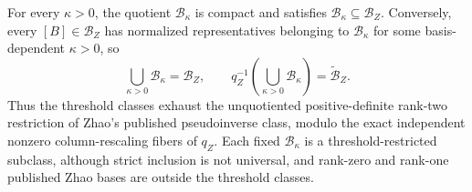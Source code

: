 For every \(\kappa>0\), the quotient \(\mathcal B_\kappa\) is compact and satisfies \(\mathcal B_\kappa\subseteq\mathcal B_Z\).  Conversely, every \([B]\in\mathcal B_Z\) has normalized representatives belonging to \(\mathcal B_\kappa\) for some basis-dependent \(\kappa>0\), so
\[
\bigcup_{\kappa>0}\mathcal B_\kappa=\mathcal B_Z,
\qquad
q_Z^{-1}\!\left(\bigcup_{\kappa>0}\mathcal B_\kappa\right)=\widetilde{\mathcal B}_Z.
\]
Thus the threshold classes exhaust the unquotiented positive-definite rank-two restriction of Zhao's published pseudoinverse class, modulo the exact independent nonzero column-rescaling fibers of \(q_Z\).  Each fixed \(\mathcal B_\kappa\) is a threshold-restricted subclass, although strict inclusion is not universal, and rank-zero and rank-one published Zhao bases are outside the threshold classes.